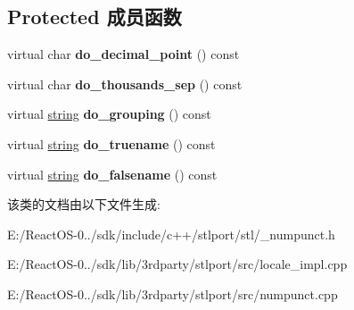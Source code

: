 \subsection*{Protected 成员函数}
\begin{DoxyCompactItemize}
\item 
\mbox{\label{classnumpunct_3_01char_01_4_a725a2e8b0e7e95a4f76647162f7eced0}} 
virtual char {\bfseries do\+\_\+decimal\+\_\+point} () const
\item 
\mbox{\label{classnumpunct_3_01char_01_4_a214499d79df0a222a63469b153d289fa}} 
virtual char {\bfseries do\+\_\+thousands\+\_\+sep} () const
\item 
\mbox{\label{classnumpunct_3_01char_01_4_ac5cf99dc919f09a095fc3d716119880c}} 
virtual \hyperlink{structstring}{string} {\bfseries do\+\_\+grouping} () const
\item 
\mbox{\label{classnumpunct_3_01char_01_4_a10bc2f5128408dea9daafea9f5b02761}} 
virtual \hyperlink{structstring}{string} {\bfseries do\+\_\+truename} () const
\item 
\mbox{\label{classnumpunct_3_01char_01_4_aa75c31cf2e2e4ff6fd57f41096de11e4}} 
virtual \hyperlink{structstring}{string} {\bfseries do\+\_\+falsename} () const
\end{DoxyCompactItemize}


该类的文档由以下文件生成\+:\begin{DoxyCompactItemize}
\item 
E\+:/\+React\+O\+S-\/0../sdk/include/c++/stlport/stl/\+\_\+numpunct.\+h\item 
E\+:/\+React\+O\+S-\/0../sdk/lib/3rdparty/stlport/src/locale\+\_\+impl.\+cpp\item 
E\+:/\+React\+O\+S-\/0../sdk/lib/3rdparty/stlport/src/numpunct.\+cpp\end{DoxyCompactItemize}
